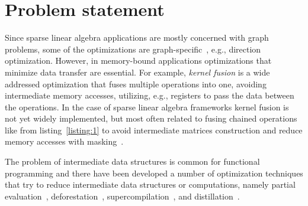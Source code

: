 \documentclass[10pt,conference]{IEEEtran}
\begin{document}
\section{Problem statement}
Since sparse linear algebra applications are mostly concerned with graph problems, some of the optimizations are graph-specific~\cite{yang2020graphblast,graphIt}, e.g., direction optimization.
However, in memory-bound applications optimizations that minimize data transfer are essential. 
For example, \emph{kernel fusion} is a wide addressed optimization that fuses multiple operations into one, avoiding intermediate memory accesses, utilizing, e.g., registers to pass the data between the operations.
In the case of sparse linear algebra frameworks kernel fusion is not yet widely implemented, but most often related to fusing chained operations like
from listing~\ref{listing:1} to avoid intermediate matrices construction and reduce memory accesses with masking~\cite{yang2020graphblast}.

The problem of intermediate data structures is common for functional programming
and there have been developed a number of 
optimization techniques that try to reduce intermediate 
data structures or computations, namely partial evaluation~\cite{jones}, deforestation~\cite{WADLER1990231}, supercompilation~\cite{supercompilation}, and distillation~\cite{distillation}.
\end{document}
